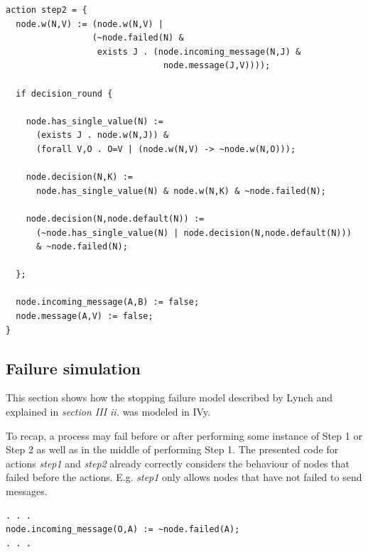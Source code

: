 \documentclass[fleqn]{article}
\begin{document}
\begin{mdframed}[nobreak=true, backgroundcolor=light-gray, roundcorner=10pt,leftmargin=1, rightmargin=1, innerleftmargin=15, innertopmargin=15,innerbottommargin=15, outerlinewidth=1, linecolor=light-gray]
\begin{lstlisting}
action step2 = {
  node.w(N,V) := (node.w(N,V) |
                 (~node.failed(N) &
                  exists J . (node.incoming_message(N,J) &
                               node.message(J,V))));

  if decision_round {

    node.has_single_value(N) :=
      (exists J . node.w(N,J)) &
      (forall V,O . O=V | (node.w(N,V) -> ~node.w(N,O)));

    node.decision(N,K) :=
      node.has_single_value(N) & node.w(N,K) & ~node.failed(N);

    node.decision(N,node.default(N)) :=
      (~node.has_single_value(N) | node.decision(N,node.default(N)))
      & ~node.failed(N);

  };

  node.incoming_message(A,B) := false;
  node.message(A,V) := false;
}
\end{lstlisting}
\end{mdframed}

\subsection{Failure simulation}


This section shows how the stopping failure model described by Lynch \cite{refNancy} and explained in \textit{section III ii.} was modeled in IVy.

To recap, a process may fail before or after performing some instance of Step 1 or Step 2 as well as in the middle of performing Step 1.  The presented code for actions \textit{step1} and \textit{step2} already correctly considers the behaviour of nodes that failed before the actions. E.g. \textit{step1} only allows nodes that have not failed to send messages.
\begin{mdframed}[nobreak=true, backgroundcolor=light-gray, roundcorner=10pt,leftmargin=1, rightmargin=1, innerleftmargin=15, innertopmargin=15,innerbottommargin=15, outerlinewidth=1, linecolor=light-gray]
\begin{lstlisting}
. . .
node.incoming_message(O,A) := ~node.failed(A);
. . .
\end{lstlisting}
\end{mdframed}
\end{document}
